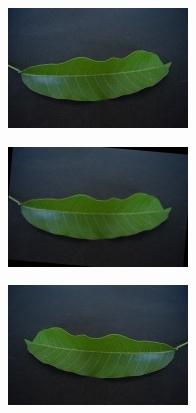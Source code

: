 \documentclass[twocolumn]{article}
\begin{document}
\begin{figure}[H]
    \centering
    \begin{subfigure}[b]{0.30\columnwidth}
        \includegraphics[width=\textwidth]{mango1}
    \end{subfigure}
    \hfill
    \begin{subfigure}[b]{0.30\columnwidth}
        \includegraphics[width=\textwidth]{mango2}
    \end{subfigure}
    \hfill
    \begin{subfigure}[b]{0.30\columnwidth}
        \includegraphics[width=\textwidth]{mango3}
    \end{subfigure}
    \vspace{0.5em}
    

\end{figure}
\end{document}
